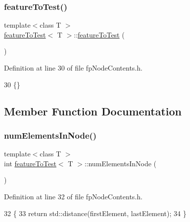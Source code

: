 \subsubsection{\texorpdfstring{feature\+To\+Test()}{featureToTest()}}
{\footnotesize\ttfamily template$<$class T $>$ \\
\hyperlink{classfeatureToTest}{feature\+To\+Test}$<$ T $>$\+::\hyperlink{classfeatureToTest}{feature\+To\+Test} (\begin{DoxyParamCaption}{ }\end{DoxyParamCaption})\hspace{0.3cm}{\ttfamily [inline]}}



Definition at line 30 of file fp\+Node\+Contents.\+h.


\begin{DoxyCode}
30 \{\}
\end{DoxyCode}


\subsection{Member Function Documentation}
\mbox{\label{classfeatureToTest_a5d5dd0a1ce8df9e0532616a30e6506dc}} 
\subsubsection{\texorpdfstring{num\+Elements\+In\+Node()}{numElementsInNode()}}
{\footnotesize\ttfamily template$<$class T $>$ \\
int \hyperlink{classfeatureToTest}{feature\+To\+Test}$<$ T $>$\+::num\+Elements\+In\+Node (\begin{DoxyParamCaption}{ }\end{DoxyParamCaption})\hspace{0.3cm}{\ttfamily [inline]}}



Definition at line 32 of file fp\+Node\+Contents.\+h.


\begin{DoxyCode}
32                                       \{
33 \textcolor{keywordflow}{return} std::distance(firstElement, lastElement);
34         \}
\end{DoxyCode}


